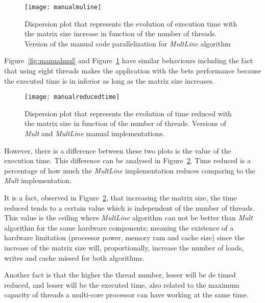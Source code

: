 \begin{figure}[htb]
	\begin{center}
		\leavevmode
		\texttt{[image: manualmuline]}
		\caption{Dispersion plot that represents the evolution of execution time with the matrix size increase in function of the number of threads. Version of the manual code parallelization for \textsl{MultLine} algorithm}
		\label{fig:manualmuline}
	\end{center}
\end{figure}

Figure~\ref{fig:manualmul} and Figure~\ref{fig:manualmuline} have similar behaviours including the fact that using eight threads makes the application with the bets performance because the executed time is in inferior as long as the matrix size increases.

\begin{figure}[htb]
	\begin{center}
		\leavevmode
		\texttt{[image: manualreducedtime]}
		\caption{Dispersion plot that represents the evolution of time reduced with the matrix size in function of the number of threads. Versions of \textit{Mult} and \textit{MultLine} manual implementations. }
		\label{fig:manualreducedtime}
	\end{center}
\end{figure}

However, there is a difference between these two plots is the value of the execution time. This difference can be analysed in Figure~\ref{fig:manualreducedtime}. Time reduced is a percentage of how much the \textit{MultLine} implementation reduces comparing to the \textit{Mult} implementation. 

It is a fact, observed in Figure~\ref{fig:manualreducedtime}, that increasing the matrix size, the time reduced tends to a certain value which is independent of the number of threads. This value is the ceiling where \textit{MultLine} algorithm can not be better than \textit{Mult} algorithm for the same hardware components; meaning the existence of a hardware limitation (processor power, memory ram and cache size) since the increase of the matrix size will, proportionally, increase the number of loads, writes and cache missed for both algorithms.

Another fact is that the higher the thread number, lesser will be de timed reduced, and lesser will be the executed time, also related to the maximum capacity of threads a multi-core processor can have working at the same time.

